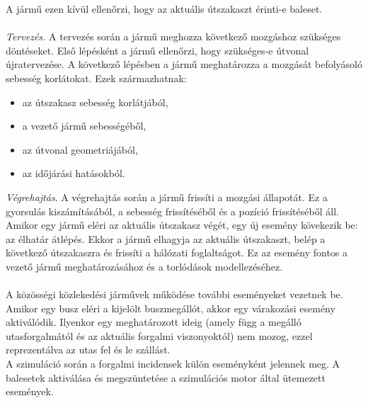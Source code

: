 \documentclass[14pt,a4paper]{extarticle}
\begin{document}
A jármű ezen kívül ellenőrzi, hogy az aktuális útszakaszt érinti-e baleset.
\\
\\
\textit{Tervezés.} A tervezés során a jármű meghozza következő mozgáshoz szükséges döntéseket. Első lépésként a jármű ellenőrzi, hogy szükséges-e útvonal újratervezése. A következő lépésben a jármű meghatározza a mozgását befolyásoló sebesség korlátokat. Ezek származhatnak:
\begin{itemize}
    \item az útszakasz sebesség korlátjából,
    \item a vezető jármű sebességéből,
    \item az útvonal geometriájából,
    \item az időjárási hatásokból.
\end{itemize}
\textit{Végrehajtás}. A végrehajtás során a jármű frissíti a mozgási állapotát. Ez a gyorsulás kiszámításából, a sebesség frissítéséből és a pozíció frissítéséből áll. Amikor egy jármű eléri az aktuális útszakasz végét, egy új esemény kövekezik be: az élhatár átlépés. Ekkor a jármű elhagyja az aktuális útszakaszt, belép a következő útszakaszra és frissíti a hálózati foglaltságot. Ez az esemény fontos a vezető jármű meghatározásához és a torlódások modellezéséhez.
\\
\\
A közösségi közlekedési járművek működése további eseményeket vezetnek be. Amikor egy busz eléri a kijelölt buszmegállót, akkor egy várakozási esemény aktiválódik. Ilyenkor egy meghatározott ideig (amely függ a megálló utasforgalmától és az aktuális forgalmi viszonyoktól) nem mozog, ezzel reprezentálva az utas fel és le szállást.
\\
A szimuláció során a forgalmi incidensek külön eseményként jelennek meg. A balesetek aktiválása és megszüntetése a szimulációs motor által ütemezett események.
\end{document}
